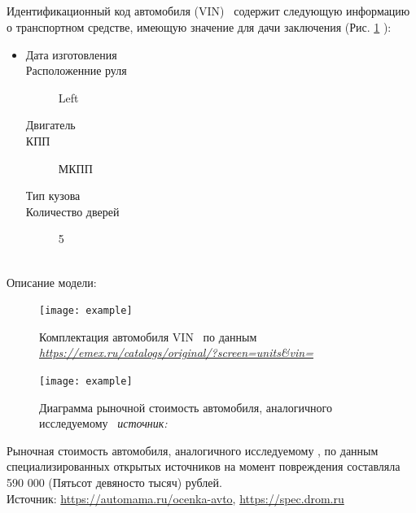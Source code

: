 \subparagraph*{} Идентификационный код автомобиля (VIN)  \vin \, содержит следующую информацию о транспортном средстве, имеющую значение для 	дачи заключения (Рис. \ref{fig:vin} ):\\[3mm]
%	
	\noindent\parbox[]{10cm}{
		\begin{itemize}
			\item[ ] 
			\begin{description}
				\item[Дата изготовления] \hfill {}
				\item[Расположенние руля] \hfill Left
				\item[Двигатель] \hfill {}
				\item[КПП] \hfill МКПП
				\item[Тип кузова] \hfill  {}
				\item[Количество дверей] \hfill 5 
					
			\end{description}
	\end{itemize}}\\
	
	

Описание модели:
	\begin{figure}[H]
		\centering
		\texttt{[image: example]}
		\caption[]{{\footnotesize Комплектация автомобиля VIN \vin\, по данным\textit{ \url{https://emex.ru/catalogs/original/?screen=units\&vin=}}} }
		\label{fig:vin}
	\end{figure}
	
\vspace{3mm}

\begin{figure}[H]
    \centering
    \texttt{[image: example]}
    \caption[]{Диаграмма рыночной стоимость автомобиля, аналогичного исследуемому \, \textsl{источник:} %
    }
    \label{fig:рыночная}
\end{figure}

Рыночная стоимость  автомобиля, аналогичного исследуемому , по данным специализированных открытых источников на момент повреждения  составляла 590 000 (Пятьсот девяносто тысяч) рублей.\\
Источник:  \url{https://automama.ru/ocenka-avto}, \url{https://spec.drom.ru}


